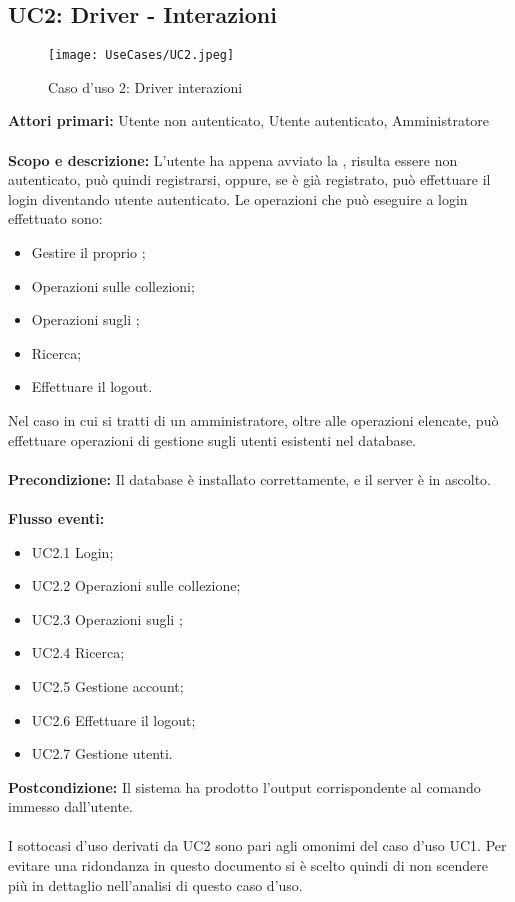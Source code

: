 \documentclass{scalatekids-article}
\begin{document}
\subsection{UC2: Driver - Interazioni}
\begin{figure}[H]
  \begin{center}
    \texttt{[image: UseCases/UC2.jpeg]}
    \caption{Caso d'uso 2: Driver interazioni}
  \end{center}
\end{figure}
\textbf{Attori primari:} Utente non autenticato, Utente autenticato, Amministratore\\ \\
\textbf{Scopo e descrizione:}
L’utente ha appena avviato la , risulta essere non autenticato, può quindi
registrarsi, oppure, se è già registrato, può effettuare il login diventando utente
autenticato. Le operazioni che può eseguire a login effettuato sono:
\begin{itemize}
\item Gestire il proprio ;
\item Operazioni sulle collezioni;
\item Operazioni sugli ;
\item Ricerca;
\item Effettuare il logout.
\end{itemize}
Nel caso in cui si tratti di un amministratore, oltre alle operazioni elencate, può effettuare operazioni di gestione sugli utenti
esistenti nel database.\\ \\
\textbf{Precondizione:} Il database è installato correttamente, e il server è in ascolto.\\ \\
\textbf{Flusso eventi:}
\begin{itemize}
\item UC2.1 Login;
\item UC2.2 Operazioni sulle collezione;
\item UC2.3 Operazioni sugli ;
\item UC2.4 Ricerca;
\item UC2.5 Gestione account;
\item UC2.6 Effettuare il logout;
\item UC2.7 Gestione utenti.
\end{itemize}
\textbf{Postcondizione:} Il sistema ha prodotto l'output corrispondente al comando immesso dall'utente.\\ \\
I sottocasi d'uso derivati da UC2 sono pari agli omonimi del caso d'uso UC1. Per evitare una ridondanza in questo documento si è scelto quindi di non scendere più in dettaglio nell'analisi di questo caso d'uso.
\end{document}
